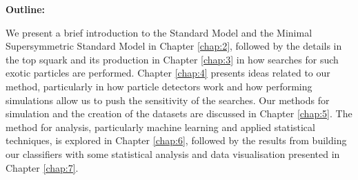 \noindent\textbf{Outline:}\par
We present a brief introduction to the Standard Model and the Minimal Supersymmetric Standard Model in Chapter \ref{chap:2}, followed by the details in the top squark and its production in Chapter \ref{chap:3} in how searches for such exotic particles are performed. Chapter \ref{chap:4} presents ideas related to our method, particularly in how particle detectors work and how performing simulations allow us to push the sensitivity of the searches. Our methods for simulation and the creation of the datasets are discussed in Chapter \ref{chap:5}. The method for analysis, particularly machine learning and applied statistical techniques, is explored in Chapter \ref{chap:6}, followed by the results from building our classifiers with some statistical analysis and data visualisation presented in Chapter \ref{chap:7}.